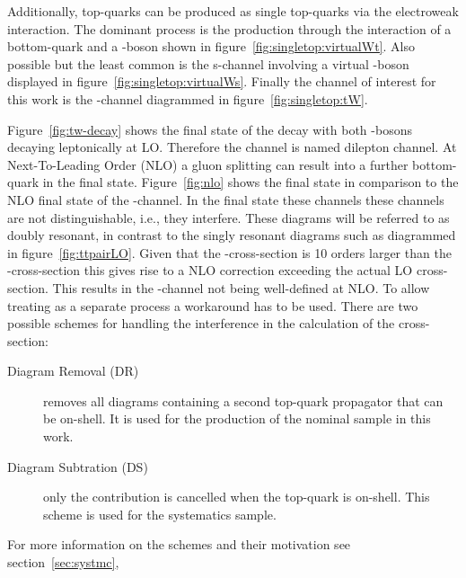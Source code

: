 Additionally, top-quarks can be produced as single top-quarks via the electroweak interaction. The dominant process is the production through the interaction of a bottom-quark and a \PW-boson shown in figure~\ref{fig:singletop:virtualWt}. Also possible but the least common is the s-channel involving a virtual \PW-boson displayed in figure~\ref{fig:singletop:virtualWs}. Finally the channel of interest for this work is the \tW-channel diagrammed in figure~\ref{fig:singletop:tW}.

Figure~\ref{fig:tw-decay} shows the final state of the \tW decay with both \PW-bosons decaying leptonically at LO. Therefore the channel is named dilepton channel.
At Next-To-Leading Order (NLO) a gluon splitting can result into a further bottom-quark in the final state. Figure~\ref{fig:nlo} shows the \ttbar final state in comparison to the NLO final state of the \tW-channel. In the final state these channels these channels are not distinguishable, {i.e.}, they interfere. These diagrams will be referred to as doubly resonant, in contrast to the singly resonant diagrams such as diagrammed in figure~\ref{fig:ttpairLO}.
Given that the \ttbar-cross-section is \num{10} orders larger than the \tW-cross-section this gives rise to a NLO correction exceeding the actual LO cross-section. This results in the \tW-channel not being well-defined at NLO.
To allow treating \tW as a separate process a workaround has to be used. There are two possible schemes for handling the interference in the calculation of the cross-section:

\begin{description}
\item[Diagram Removal (DR)] removes all diagrams containing a second top-quark propagator that can be on-shell. It is used for the production of the nominal sample in this work.
\item[Diagram Subtration (DS)] only the \ttbar contribution is cancelled when the top-quark is on-shell. This scheme is used for the systematics sample.
\end{description}

For more information on the schemes and their motivation see section~\ref{sec:systmc},

